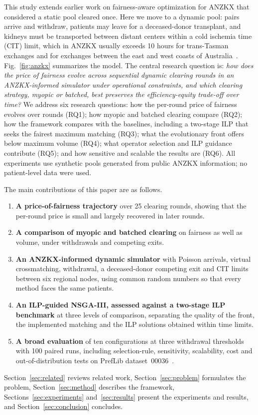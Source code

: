 \documentclass[journal]{IEEEtran}
\begin{document}
This study extends earlier work on fairness-aware optimization for ANZKX that considered a static pool cleared once. Here we move to a dynamic pool: pairs arrive and withdraw, patients
may leave for a deceased-donor transplant, and kidneys must be transported
between distant centers within a cold ischemia time (CIT) limit, which in
ANZKX usually exceeds 10 hours for trans-Tasman exchanges and for
exchanges between the east and west coasts of
Australia~\cite{anzkxprotocol6}.  Fig.~\ref{fig:anzkx} summarizes the
model.
The central research question is: \emph{how does the price of fairness
evolve across sequential dynamic clearing rounds in an ANZKX-informed
simulator under operational constraints, and which clearing
strategy, myopic or batched, best preserves the efficiency-equity
trade-off over time?}
We address six research questions: how the per-round price of fairness evolves over rounds
(RQ1); how myopic and batched clearing compare (RQ2); how the
framework compares with the baselines, including a two-stage ILP that seeks the fairest maximum matching (RQ3); what the
evolutionary front offers below maximum volume (RQ4); what operator
selection and ILP guidance contribute (RQ5); and how sensitive and
scalable the results are (RQ6). All experiments use synthetic pools generated from public ANZKX information; no patient-level data were used.

The main contributions of this paper are as follows.
\begin{enumerate}
  \item \textbf{A price-of-fairness trajectory} over 25 clearing rounds,
    showing that the per-round price is small and largely recovered in
    later rounds.
  \item \textbf{A comparison of myopic and batched clearing} on fairness as
    well as volume, under withdrawals and competing exits.
  \item \textbf{An ANZKX-informed dynamic simulator} with Poisson
    arrivals, virtual crossmatching, withdrawal, a deceased-donor competing
    exit and CIT limits between six regional nodes, using common random
    numbers so that every method faces the same patients.
  \item \textbf{An ILP-guided NSGA-III, assessed against a two-stage ILP
    benchmark} at three levels of comparison, separating the quality of the
    front, the implemented matching and the ILP solutions obtained within
    time limits.
  \item \textbf{A broad evaluation} of ten configurations at three
    withdrawal thresholds with 100 paired runs, including selection-rule,
    sensitivity, scalability, cost and out-of-distribution tests on PrefLib
    dataset~00036~\cite{mattei2013preflib}.
\end{enumerate}
Section~\ref{sec:related} reviews related work, Section~\ref{sec:problem}
formulates the problem, Section~\ref{sec:method} describes the framework,
Sections~\ref{sec:experiments} and~\ref{sec:results} present the
experiments and results, and Section~\ref{sec:conclusion} concludes.
\end{document}
